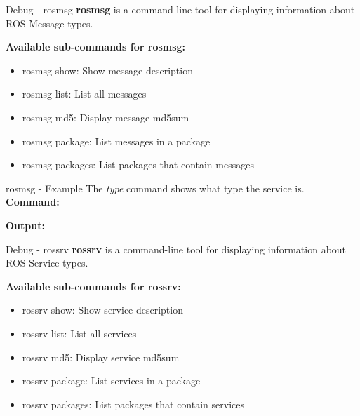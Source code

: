 \documentclass{beamer}
\begin{document}
\begin{frame}{Debug - rosmsg}
	\textbf{rosmsg} is a command-line tool for displaying information about ROS Message types.
	\newline
	\newline
	\begin{large}\textbf{Available sub-commands for rosmsg:}\end{large}
	\begin{itemize}
		\item rosmsg show: Show message description 
		\item rosmsg list: List all messages
		\item rosmsg md5: Display message md5sum
		\item rosmsg package: List messages in a package
		\item rosmsg packages: List packages that contain messages
	\end{itemize}
\end{frame}
\begin{frame}{rosmsg - Example}
The \textit{type} command shows what type the service is.
\newline
\textbf{Command:} 


\textbf{Output:}

\end{frame}
\begin{frame}{Debug - rossrv}
	\textbf{rossrv} is a command-line tool for displaying information about ROS Service types.
	\newline
	\newline
	\begin{large}\textbf{Available sub-commands for rossrv:}\end{large}
	\begin{itemize}
		\item rossrv show: Show service description
		\item rossrv list: List all services
		\item rossrv md5: Display service md5sum
		\item rossrv package: List services in a package
		\item rossrv packages: List packages that contain services
		
	\end{itemize}
\end{frame}
\end{document}
